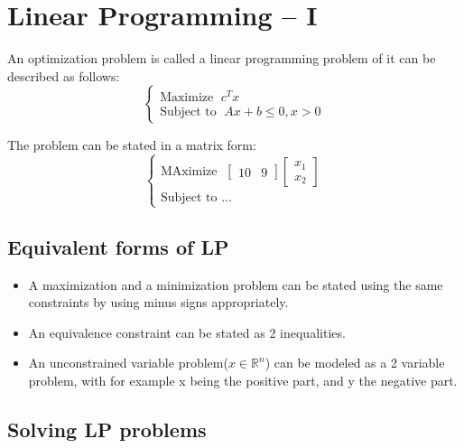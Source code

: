 
\chapter{Linear Programming -- I}


{
    An optimization problem is called a linear programming problem of it can
    be described as follows:
    \begin{equation}
        \begin{cases}
        \text{Maximize  }\; c^{T}x\\
        \text{Subject to  }\; Ax+b\le 0, x > 0  
        \end{cases}
    \end{equation}
    
    The problem can be stated in a matrix form:
    {
        \begin{equation}
            \begin{cases}
                \text{MAximize  }\; \begin{bmatrix}
                    10 &9  
                \end{bmatrix} \begin{bmatrix}
                     x_1\\x_2
                \end{bmatrix}
                \\
                \text{Subject to ...}
            \end{cases}
        \end{equation}
    }
}

\section{Equivalent forms of LP}
\begin{itemize}
    \item A maximization and a minimization problem can be stated using the same constraints by using minus signs appropriately.
    \item An equivalence constraint can be stated as 2 inequalities.
    \item An unconstrained variable problem($x \in \mathbb{R}^{n}$) can be modeled as a 2 variable problem, with for example x being the positive part, and y the negative part.
\end{itemize}

\section{Solving LP problems}
